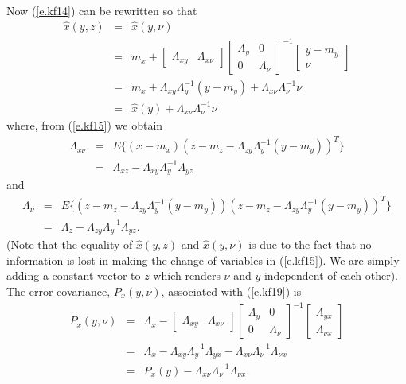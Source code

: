 	Now (\ref{e.kf14}) can be rewritten so that
%
\begin{eqnarray}
\hat{x}(y,z)&=&\hat{x}(y,\nu)\nonumber\\
            &=&m_x+[\begin{array}{cc}
\Lambda_{xy}&\Lambda_{x\nu}\end{array}]
\left[\begin{array}{cc}\Lambda_y & 0\\
                       0 & \Lambda_{\nu}\end{array}\right]^{-1}
\left[\begin{array}{c}
y-m_y\\\nu\end{array}\right]\nonumber\\
           &=&m_x+\Lambda_{xy}\Lambda_y^{-1}(y-m_y)+\Lambda_{x\nu}
               \Lambda_{\nu}^{-1}\nu\nonumber\\
           &=&\hat{x}(y)+\Lambda_{x\nu}\Lambda_{\nu}^{-1}\nu
\label{e.kf19}
\end{eqnarray}
%
where, from (\ref{e.kf15}) we obtain
%
\begin{eqnarray}
\Lambda_{x\nu}&=&E\{(x-m_x)(z-m_z-\Lambda_{zy}\Lambda_y^{-1}(y-m_y))^T\}\nonumber\\
       &=&\Lambda_{xz}-\Lambda_{xy}\Lambda_y^{-1}\Lambda_{yz}
\label{e.kf20}
\end{eqnarray}
%
and
%
\begin{eqnarray}
\Lambda_{\nu}&=&E\{(z-m_z-\Lambda_{zy}\Lambda_y^{-1}(y-m_y))(z-m_z-\Lambda_{zy}\Lambda_y^{-1}(y-m_y))^T\}\nonumber\\
       &=&\Lambda_{z}-\Lambda_{zy}\Lambda_y^{-1}\Lambda_{yz}.
\label{e.kf21}
\end{eqnarray}
%
(Note that the equality of $\hat{x}(y,z)$ and $\hat{x}(y,\nu)$ is due to the
fact that no information is lost in making the change of
variables in (\ref{e.kf15}).  We are simply adding a constant vector
to $z$ which renders $\nu$ and $y$ independent of each other).
The error covariance, $P_x(y,\nu)$, associated with (\ref{e.kf19}) is
%
\begin{eqnarray}
P_x(y,\nu)&=&
            \Lambda_x-[\begin{array}{cc}
\Lambda_{xy}&\Lambda_{x\nu}\end{array}]
\left[\begin{array}{cc}\Lambda_y & 0\\
                       0 & \Lambda_{\nu}\end{array}\right]^{-1}
\left[\begin{array}{c}
\Lambda_{yx}\\\Lambda_{\nu x}\end{array}\right]\nonumber\\
           &=&\Lambda_x-\Lambda_{xy}\Lambda_y^{-1}\Lambda_{yx}-\Lambda_{x\nu}
               \Lambda_{\nu}^{-1}\Lambda_{\nu x}\nonumber\\
           &=&P_x(y)-\Lambda_{x\nu}\Lambda_{\nu}^{-1}\Lambda_{\nu x}.
\label{e.kf22}
\end{eqnarray}
%
